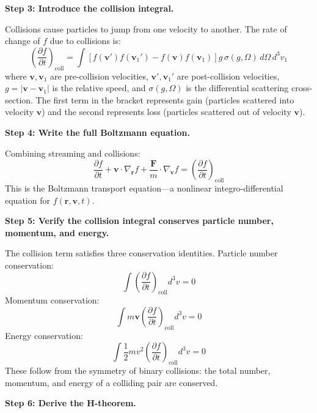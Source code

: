 \textbf{Step 3: Introduce the collision integral.}

Collisions cause particles to jump from one velocity to another. The rate of change of $f$ due to collisions is:
\begin{equation}
\left(\frac{\partial f}{\partial t}\right)_{\text{coll}} = \int\left[f(\mathbf{v}')f(\mathbf{v}_1') - f(\mathbf{v})f(\mathbf{v}_1)\right]g\,\sigma(g,\Omega)\,d\Omega\,d^3v_1
\end{equation}
where $\mathbf{v},\mathbf{v}_1$ are pre-collision velocities, $\mathbf{v}',\mathbf{v}_1'$ are post-collision velocities, $g = |\mathbf{v} - \mathbf{v}_1|$ is the relative speed, and $\sigma(g,\Omega)$ is the differential scattering cross-section. The first term in the bracket represents gain (particles scattered into velocity $\mathbf{v}$) and the second represents loss (particles scattered out of velocity $\mathbf{v}$).

\textbf{Step 4: Write the full Boltzmann equation.}

Combining streaming and collisions:
\begin{equation}
\frac{\partial f}{\partial t} + \mathbf{v}\cdot\nabla_{\mathbf{r}} f + \frac{\mathbf{F}}{m}\cdot\nabla_{\mathbf{v}} f = \left(\frac{\partial f}{\partial t}\right)_{\text{coll}}
\end{equation}
This is the Boltzmann transport equation---a nonlinear integro-differential equation for $f(\mathbf{r},\mathbf{v},t)$.

\textbf{Step 5: Verify the collision integral conserves particle number, momentum, and energy.}

The collision term satisfies three conservation identities. Particle number conservation:
\begin{equation}
\int\left(\frac{\partial f}{\partial t}\right)_{\text{coll}}d^3v = 0
\end{equation}
Momentum conservation:
\begin{equation}
\int m\mathbf{v}\left(\frac{\partial f}{\partial t}\right)_{\text{coll}}d^3v = 0
\end{equation}
Energy conservation:
\begin{equation}
\int\frac{1}{2}mv^2\left(\frac{\partial f}{\partial t}\right)_{\text{coll}}d^3v = 0
\end{equation}
These follow from the symmetry of binary collisions: the total number, momentum, and energy of a colliding pair are conserved.

\textbf{Step 6: Derive the H-theorem.}

